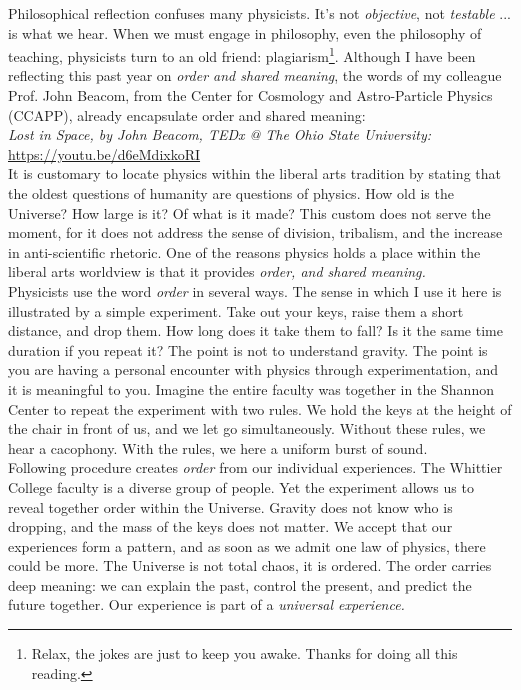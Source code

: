 \documentclass[../../../main.tex]{subfiles}
\begin{document}
Philosophical reflection confuses many physicists.  It's not \textit{objective}, not \textit{testable} ... is what we hear.  When we must engage in philosophy, even the philosophy of teaching, physicists turn to an old friend: plagiarism\footnote{Relax, the jokes are just to keep you awake.  Thanks for doing all this reading.}.  Although I have been reflecting this past year on \textit{order and shared meaning}, the words of my colleague Prof. John Beacom, from the Center for Cosmology and Astro-Particle Physics (CCAPP), already encapsulate order and shared meaning:
\\
\vspace{0.15cm}
\textit{Lost in Space, by John Beacom, TEDx @ The Ohio State University:} \url{https://youtu.be/d6eMdixkoRI}
\\
\vspace{0.15cm}
It is customary to locate physics within the liberal arts tradition by stating that the oldest questions of humanity are questions of physics.  How old is the Universe?  How large is it?  Of what is it made?  This custom does not serve the moment, for it does not address the sense of division, tribalism, and the increase in anti-scientific rhetoric.  One of the reasons physics holds a place within the liberal arts worldview is that it provides \textit{order, and shared meaning.}
\\
\vspace{0.15cm}
Physicists use the word \textit{order} in several ways.  The sense in which I use it here is illustrated by a simple experiment.  Take out your keys, raise them a short distance, and drop them.  How long does it take them to fall?  Is it the same time duration if you repeat it?  The point is not to understand gravity.  The point is you are having a personal encounter with physics through experimentation, and it is meaningful to you.  Imagine the entire faculty was together in the Shannon Center to repeat the experiment with two rules.  We hold the keys at the height of the chair in front of us, and we let go simultaneously.  Without these rules, we hear a cacophony.  With the rules, we here a uniform burst of sound.
\\
\vspace{0.15cm}
Following procedure creates \textit{order} from our individual experiences.  The Whittier College faculty is a diverse group of people.  Yet the experiment allows us to reveal together order within the Universe.  Gravity does not know who is dropping, and the mass of the keys does not matter.  We accept that our experiences form a pattern, and as soon as we admit one law of physics, there could be more.  The Universe is not total chaos, it is ordered.  The order carries deep meaning: we can explain the past, control the present, and predict the future together.  Our experience is part of a \textit{universal experience.}
\end{document}
